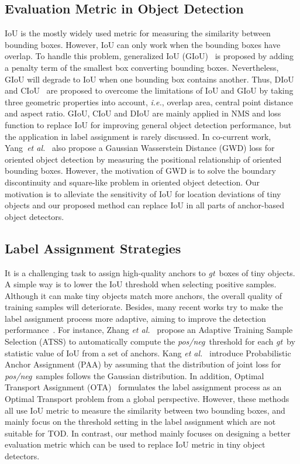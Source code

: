 \documentclass{article}
\newcommand{\ie}{\textit{i.e.}}
\newcommand{\etal}{\textit{et al.}}
\newcommand{\gt}{\textit{gt}~}
\newcommand{\posneg}{\textit{pos/neg}~}
\begin{document}
\subsection{Evaluation Metric in Object Detection}

IoU is the mostly widely used metric for measuring the similarity between bounding boxes. However, IoU can only work when the bounding boxes have overlap. To handle this problem, generalized IoU (GIoU)~\cite{GIoU_loss_2019_CVPR} is proposed by adding a penalty term of the smallest box converting bounding boxes. Nevertheless, GIoU will degrade to IoU when one bounding box contains another. Thus, DIoU~\cite{diou_2020_aaai} and CIoU~\cite{diou_2020_aaai} are proposed to overcome the limitations of IoU and GIoU by taking three geometric properties into account, \ie, overlap area, central point distance and aspect ratio. GIoU, CIoU and DIoU are mainly applied in NMS and loss function to replace IoU for improving general object detection performance, but the application in label assignment is rarely discussed. In co-current work, Yang~\etal~\cite{gwd_2021_icml} also propose a Gaussian Wasserstein Distance (GWD) loss for oriented object detection by measuring the positional relationship of oriented bounding boxes. However, the motivation of GWD is to solve the boundary discontinuity and square-like problem in oriented object detection. Our motivation is to alleviate the sensitivity of IoU for location deviations of tiny objects and our proposed method can replace IoU in all parts of anchor-based object detectors.

\subsection{Label Assignment Strategies}
It is a challenging task to assign high-quality anchors to \gt boxes of tiny objects. A simple way is to lower the IoU threshold when selecting positive samples. Although it can make tiny objects match more anchors, the overall quality of training samples will deteriorate. Besides, many recent works try to make the label assignment process more adaptive, aiming to improve the detection performance~\cite{ota_2021_arxiv}. For instance, Zhang \etal~\cite{atss_2020_cvpr} propose an Adaptive
Training Sample Selection (ATSS) to automatically compute the \posneg threshold for each \gt by statistic value of IoU from a set of anchors. Kang \etal~\cite{paassignment_2020_eccv} introduce Probabilistic Anchor Assignment (PAA) by assuming that the distribution of joint loss for \posneg samples follows the Gaussian distribution. In addition, Optimal Transport Assignment (OTA)~\cite{ota_2021_arxiv} formulates the label assignment process as an Optimal Transport problem from a global perspective. However, these methods all use IoU metric to measure the similarity between two bounding boxes, and mainly focus on the threshold setting in the label assignment which are not suitable for TOD. In contrast, our method mainly focuses on designing a better evaluation metric which can be used to replace IoU metric in tiny object detectors.
\end{document}
